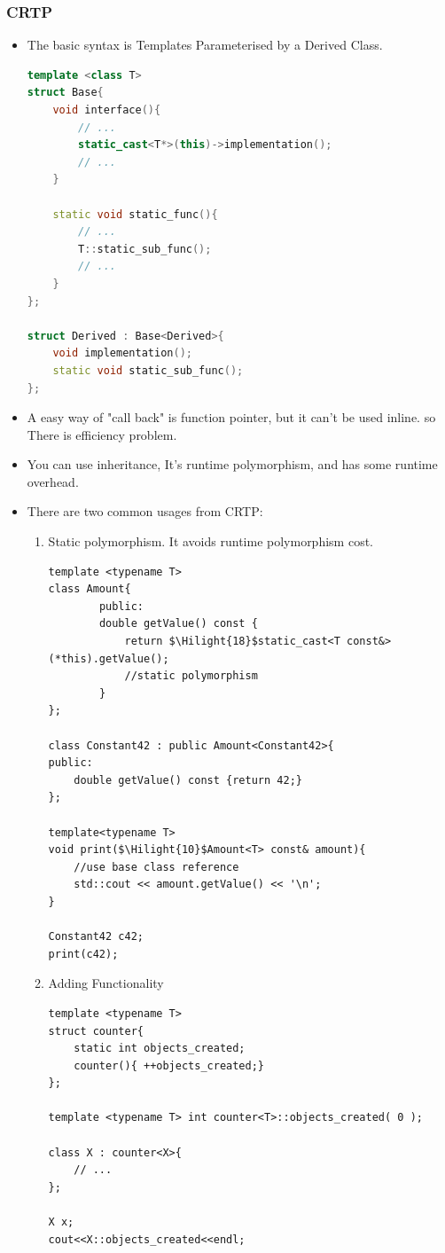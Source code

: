 \documentclass[a4paper,11pt,twoside]{book}
\newcommand{\Hilight}[1]{\makebox[0pt][l]{\color{yellow}\rule[-3pt]{#1em}{11pt}}}
\newcommand{\Hilight}[1]{}
\begin{document}
\subsubsection{CRTP}
\begin{itemize}
	\item The basic syntax is Templates Parameterised by a Derived Class.
	
\begin{lstlisting}[frame=single, language=c++]
template <class T> 
struct Base{
	void interface(){
		// ...
		static_cast<T*>(this)->implementation();
		// ...
	}
	
	static void static_func(){
		// ...
		T::static_sub_func();
		// ...
	}
};
	
struct Derived : Base<Derived>{
	void implementation();
	static void static_sub_func();
};
\end{lstlisting}
	
	\item A easy way of "call back" is function pointer, but it can't be used inline. so There is efficiency problem. 
	
	\item You can use inheritance, It's runtime polymorphism, and has some runtime overhead. 
	
	\item There are two common usages from CRTP:
	\begin{enumerate}
		\item Static polymorphism. It avoids runtime polymorphism cost. 
\begin{lstlisting}
template <typename T>
class Amount{
		public:
		double getValue() const {
			return $\Hilight{18}$static_cast<T const&>(*this).getValue();
			//static polymorphism
		}
};

class Constant42 : public Amount<Constant42>{
public:
	double getValue() const {return 42;}
};

template<typename T>
void print($\Hilight{10}$Amount<T> const& amount){
	//use base class reference
	std::cout << amount.getValue() << '\n';
}

Constant42 c42;
print(c42);
\end{lstlisting}
\item Adding Functionality
\begin{lstlisting}
template <typename T>
struct counter{
	static int objects_created;
	counter(){ ++objects_created;}
};

template <typename T> int counter<T>::objects_created( 0 );

class X : counter<X>{
	// ...
};

X x;
cout<<X::objects_created<<endl;
\end{lstlisting}
	\end{enumerate}
\end{itemize}
\end{document}
